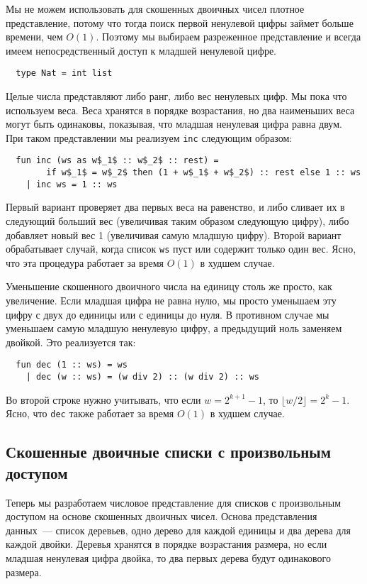 \begin{frame}[fragile]{}
Мы не можем использовать для скошенных двоичных чисел плотное
представление, потому что тогда поиск первой ненулевой цифры займет
больше времени, чем $O(1)$. Поэтому мы выбираем разреженное
представление и всегда имеем непосредственный доступ к младшей
ненулевой цифре.
\begin{lstlisting}
  type Nat = int list
\end{lstlisting}
Целые числа представляют либо ранг, либо вес ненулевых цифр. Мы пока
что используем веса. Веса хранятся в порядке возрастания, но два
наименьших веса могут быть одинаковы, показывая, что младшая ненулевая
цифра равна двум. При таком представлении мы реализуем \lstinline!inc!
следующим образом:
\begin{lstlisting}
  fun inc (ws as w$_1$ :: w$_2$ :: rest) =
        if w$_1$ = w$_2$ then (1 + w$_1$ + w$_2$) :: rest else 1 :: ws
    | inc ws = 1 :: ws
\end{lstlisting}
Первый вариант проверяет два первых веса на равенство, и либо сливает
их в следующий больший вес (увеличивая таким образом следующую цифру),
либо добавляет новый вес 1 (увеличивая самую младшую цифру). Второй
вариант обрабатывает случай, когда список \lstinline!ws! пуст или
содержит только один вес. Ясно, что эта процедура работает за время
$O(1)$ в худшем случае.

Уменьшение скошенного двоичного числа на единицу столь же просто, как
увеличение. Если младшая цифра не равна нулю, мы просто уменьшаем эту
цифру с двух до единицы или с единицы до нуля. В противном случае мы
уменьшаем самую младшую ненулевую цифру, а предыдущий ноль заменяем
двойкой. Это реализуется так:
\begin{lstlisting}
  fun dec (1 :: ws) = ws
    | dec (w :: ws) = (w div 2) :: (w div 2) :: ws
\end{lstlisting}
Во второй строке нужно учитывать, что если $w = 2^{k+1} - 1$, то
$\lfloor w/2 \rfloor = 2^k - 1$. Ясно, что \lstinline!dec! также
работает за время $O(1)$ в худшем случае.

\subsection{Скошенные двоичные списки с произвольным доступом}
\label{sc:9.3.1}

Теперь мы разработаем числовое представление для списков с
произвольным доступом на основе скошенных двоичных чисел.  Основа
представления данных~--- список деревьев, одно дерево для каждой
единицы и два дерева для каждой двойки. Деревья хранятся в порядке
возрастания размера, но если младшая ненулевая цифра двойка, то два
первых дерева будут одинакового размера.


\end{frame}
